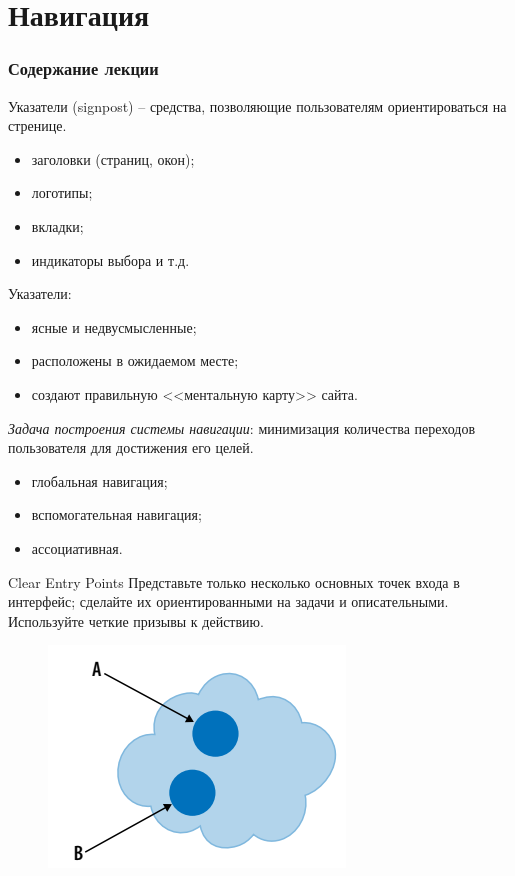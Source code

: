 \documentclass{beamer}
\begin{document}
\section{Навигация}

\begin{frame}
  \frametitle{Содержание лекции}
  \tableofcontents[current]
\end{frame}

\begin{frame}[t]
	Указатели (signpost) -- средства, позволяющие пользователям ориентироваться на стренице.
	\begin{itemize}
		\item заголовки (страниц, окон);
		\item логотипы;
		\item вкладки;
		\item индикаторы выбора и т.д.						
	\end{itemize}	
	Указатели:
	\begin{itemize}
		\item ясные и недвусмысленные;
		\item расположены в ожидаемом месте;
		\item создают правильную <<ментальную карту>> сайта.
	\end{itemize}
	\textit{Задача построения системы навигации}: минимизация количества переходов пользователя для достижения его целей.
	\begin{itemize}
		\item глобальная навигация;
		\item вспомогательная навигация;
		\item ассоциативная.
	\end{itemize}	
\end{frame} 

\begin{frame}[t]{Clear Entry Points}
	Представьте только несколько основных точек входа в интерфейс; сделайте их ориентированными на задачи и описательными. Используйте четкие призывы к действию. 
	\begin{figure}[h]
		\centering
		\includegraphics[scale=0.75]{images/lec07-pic23.png}
	\end{figure}
\end{frame}
\end{document}
